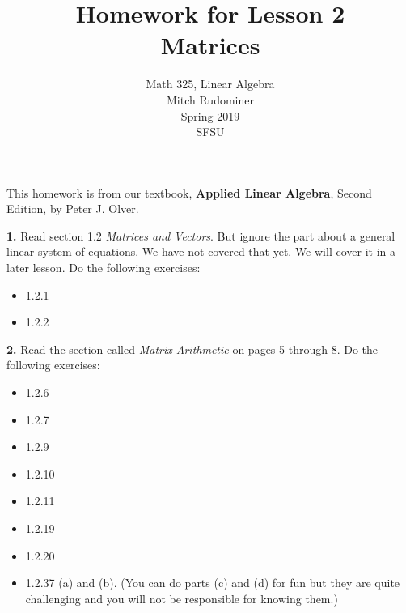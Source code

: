 \documentclass[oneside,12pt]{amsart}
\begin{document}
\title{Homework for Lesson 2 \\ Matrices}
\author{Math 325, Linear Algebra \\ Mitch Rudominer \\ Spring 2019 \\ SFSU }
\date{}

\maketitle

This homework is from our textbook,
\textbf{Applied Linear Algebra}, Second Edition, by Peter J. Olver.

\bigskip

\textbf{1.} Read section 1.2 \emph{Matrices and Vectors}. But ignore the part
about a general linear system of equations. We have not covered that yet.
We will cover it in a later lesson. Do the following exercises:
\begin{itemize}
\item 1.2.1
\item 1.2.2
\end{itemize}


\bigskip

\textbf{2.} Read the section called \emph{Matrix Arithmetic} on pages 5 through
8. Do the following exercises:
\begin{itemize}
\item 1.2.6
\item 1.2.7
\item 1.2.9
\item 1.2.10
\item 1.2.11
\item 1.2.19
\item 1.2.20
\item 1.2.37 (a) and (b). (You can do parts (c) and (d) for fun but they are
quite challenging and you will not be responsible for knowing them.)
\end{itemize}
\end{document}
